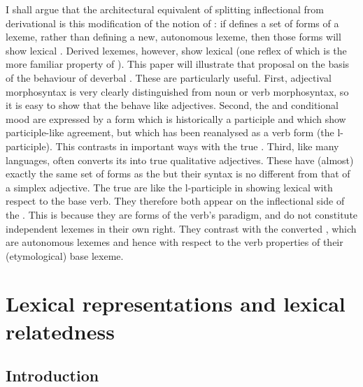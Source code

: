 \documentclass[output=paper,
modfonts
]{LSP/langsci}
\begin{document}
I shall argue that the  architectural equivalent of splitting inflectional from derivational  is this modification of the notion of : if  defines a set of forms of a lexeme, rather than defining a new, autonomous lexeme, then those forms will show lexical . Derived lexemes, however, show lexical  (one reflex of which is the more familiar property of ). This paper will illustrate that proposal on the basis of the behaviour of  deverbal . These are particularly useful. First,  adjectival morphosyntax is very clearly distinguished from noun or verb morphosyntax, so it is easy to show that the  behave like adjectives. Second, the   and conditional mood are expressed by a form which is historically a participle and which show participle-like agreement, but which has been reanalysed as a verb form (the l-participle). This contrasts in important ways with the true . Third, like many languages,  often converts its  into true qualitative adjectives. These have (almost) exactly the same set of forms as the  but their syntax is no different from that of a simplex adjective. The true  are like the l-participle in showing lexical  with respect to the base verb. They therefore both appear on the inflectional side of the . This is because they are forms of the verb’s paradigm, and do not constitute independent lexemes in their own right. They contrast with the converted , which are autonomous lexemes and hence  with respect to the verb properties of their (etymological) base lexeme.

\nocite{RussGramm80-I}
\section{Lexical representations and lexical relatedness}\label{sec:lexreprel}

\subsection{Introduction}
\end{document}
